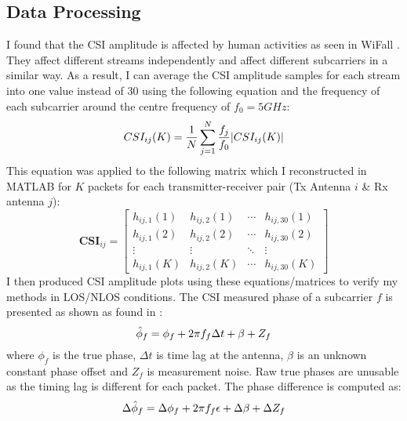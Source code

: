 \subsection{Data Processing}
I found that the CSI amplitude is affected by human activities as seen in WiFall \citep{WiFall}. They affect different streams independently and affect different subcarriers in a similar way. As a result, I can average the CSI amplitude samples for each stream into one value instead of 30 using the following equation and the frequency of each subcarrier around the centre frequency of $f_0 = 5GHz$:
\vspace{-11pt}
\begin{equation}\label{eqn:3.1}
    CSI_{ij}(K) = \frac{1}{N} \sum_{j=1}^{N} \frac{f_j}{f_0} |CSI_{ij}(K)|
    \vspace{-11pt}
\end{equation}
This equation was applied to the following matrix which I reconstructed in MATLAB for $K$ packets for each transmitter-receiver pair (Tx Antenna $i$ \& Rx antenna $j$):
\begin{equation}\label{eqn:3.2}
\textbf{CSI}_{ij}=\left[
\begin{array}{cccc}
    h_{ij,1}(1) & h_{ij,2}(1) & \cdots & h_{ij,30}(1) \\
    h_{ij,1}(2) & h_{ij,2}(2) & \cdots & h_{ij,30}(2) \\
   \vdots & \vdots & \ddots & \vdots \\
    h_{ij,1}(K) & h_{ij,2}(K) & \cdots & h_{ij,30}(K) 
\end{array}
\right]
\end{equation}
I then produced CSI amplitude plots using these equations/matrices to verify my methods in LOS/NLOS conditions. The CSI measured phase of a subcarrier $f$ is presented as shown as found in \cite{MonaLisaSpotFi}:
\vspace{-11pt}
\begin{equation}\label{eqn:3.3}
    \hat{\phi}_f = \phi_{f}+2\pi f_{f}\Delta t + \beta + Z_f
    \vspace{-11pt}
\end{equation}
where $\phi_{f}$ is the true phase, $\Delta t$ is time lag at the antenna, $\beta$ is an unknown constant phase offset and $Z_f$ is measurement noise. Raw true phases are unusable as the timing lag is different for each packet. The phase difference is computed as:
\vspace{-11pt}
\begin{equation}\label{eqn:3.4}
    \Delta\hat{\phi}_f = \Delta\phi_{f}+2\pi f_{f}\epsilon  + \Delta\beta + \Delta Z_f
    \vspace{-11pt}
\end{equation}
